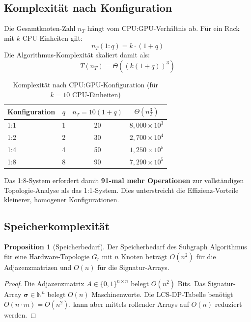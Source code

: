 ﻿\documentclass[a4paper,12pt]{article}
\theoremstyle{definition}
\newtheorem{proposition}{Proposition}
\begin{document}
\subsection{Komplexit\"at nach Konfiguration}

Die Gesamtknoten-Zahl $n_T$ h\"angt vom CPU:GPU-Verh\"altnis ab.
F\"ur ein Rack mit $k$ CPU-Einheiten gilt:
\[
  n_T(1:q) = k \cdot (1 + q)
\]
Die Algorithmus-Komplexit\"at skaliert damit als:
\[
  T(n_T) = \Theta\!\left((k(1+q))^3\right)
\]

\begin{table}[h!]
\centering
\caption{Komplexit\"at nach CPU:GPU-Konfiguration (f\"ur $k=10$ CPU-Einheiten)}
\begin{tabular}{l|c|c|c}
\toprule
Konfiguration & $q$ & $n_T = 10(1+q)$ & $\Theta(n_T^3)$ \\
\midrule
1:1 & 1 & 20  & $8{,}000 \times 10^3$ \\
1:2 & 2 & 30  & $2{,}700 \times 10^4$ \\
1:4 & 4 & 50  & $1{,}250 \times 10^5$ \\
1:8 & 8 & 90  & $7{,}290 \times 10^5$ \\
\bottomrule
\end{tabular}
\end{table}

Das 1:8-System erfordert damit \textbf{91-mal mehr Operationen} zur
vollst\"andigen Topologie-Analyse als das 1:1-System. Dies unterstreicht die
Effizienz-Vorteile kleinerer, homogener Konfigurationen.

\subsection{Speicherkomplexit\"at}

\begin{proposition}[Speicherbedarf]
  Der Speicherbedarf des Subgraph Algorithmus f\"ur eine Hardware-Topologie
  $G_r$ mit $n$ Knoten betr\"agt $O(n^2)$ f\"ur die Adjazenzmatrizen und
  $O(n)$ f\"ur die Signatur-Arrays.
\end{proposition}

\begin{proof}
  Die Adjazenzmatrix $A \in \{0,1\}^{n\times n}$ belegt $O(n^2)$ Bits.
  Das Signatur-Array $\boldsymbol{\sigma} \in \mathbb{N}^n$ belegt $O(n)$
  Maschinenworte. Die LCS-DP-Tabelle ben\"otigt $O(n \cdot m) = O(n^2)$,
  kann aber mittels rollender Arrays auf $O(n)$ reduziert werden. \qedhere
\end{proof}
\end{document}
